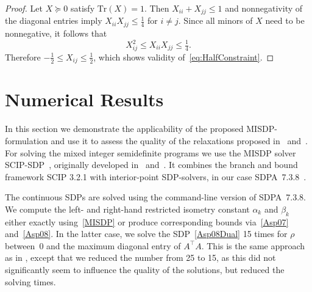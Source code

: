 \documentclass[journal]{IEEEtran}
\newcommand{\T}{^{\top}}
\newcommand{\Tr}{\text{Tr}}
\begin{document}
\begin{proof}
  Let $X \succeq 0$ satisfy $\Tr(X)=1$. Then $X_{ii}+X_{jj}\leq 1$ and
  nonnegativity of the diagonal entries imply $X_{ii}X_{jj}\leq
  \tfrac{1}{4}$ for $i \neq j$. Since all minors of $X$ need to be nonnegative, it
  follows that
  \begin{equation*}
    X_{ij}^2 \leq  X_{ii} X_{jj} \leq \tfrac{1}{4}.
  \end{equation*}
  Therefore $- \tfrac{1}{2} \leq X_{ij} \leq \tfrac{1}{2}$, which shows
  validity of~\eqref{eq:HalfConstraint}.
\end{proof}


\section{Numerical Results}
\label{sec:numerical_results}

\noindent
In this section we demonstrate the applicability of the proposed MISDP-formulation and use it to
assess the quality of the relaxations proposed in~\cite{Asp08} and~\cite{Asp07}.
For solving the mixed integer semidefinite programs we use the MISDP solver SCIP-SDP~\cite{SCIP-SDP},
originally developed in~\cite{Mar13} and~\cite{MS12}. It combines the
branch and bound framework SCIP 3.2.1 \cite{SCIP} with 
interior-point SDP-solvers, in our case SDPA~7.3.8~\cite{SDPA6,SDPA7}.

The continuous SDPs are solved using the command-line version of
SDPA~7.3.8. We compute the left- and right-hand restricted isometry
constant $\alpha_k$ and $\beta_k$ either exactly using~\eqref{MISDP} or
produce corresponding bounds via~\eqref{Asp07} and~\eqref{Asp08}. In
the latter case, we solve the SDP~\eqref{Asp08Dual} 15 times for $\rho$ between~$0$ and the maximum
diagonal entry of $A\T A$. This is the same approach as in \cite{Asp08},
except that we reduced the number from 25 to 15, as this did
not significantly seem to influence the quality of the solutions,
but reduced the solving times.
\end{document}
